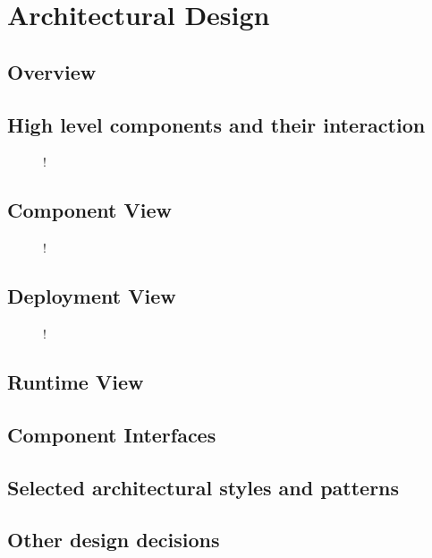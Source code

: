 \section{Architectural Design}
\subsection{Overview}
\subsection{High level components and their interaction}
\begin{figure}[H]
	\centering
	\resizebox{6in}
	{!}{}
\end{figure}
\subsection{Component View}
\begin{figure}[H]
	\centering
	\resizebox{6in}
	{!}{}
\end{figure}
\subsection{Deployment View}
\begin{figure}[H]
	\centering
	\resizebox{6in}
	{!}{}
\end{figure}
\subsection{Runtime View}
\subsection{Component Interfaces}
\subsection{Selected architectural styles and patterns}
\subsection{Other design decisions}